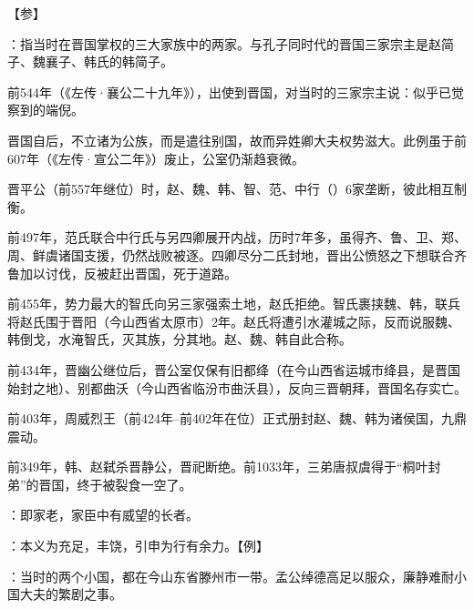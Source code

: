 {【参】}
{}


{
\item {}：指当时在晋国掌权的三大家族中的两家。与孔子同时代的晋国三家宗主是赵简子、魏襄子、韩氏的韩简子。

前544年（《左传·襄公二十九年》），出使到晋国，对当时的三家宗主说：似乎已觉察到的端倪。
\begin{lyenumerate}
\item 晋国自后，不立诸为公族，而是遣往别国，故而异姓卿大夫权势滋大。此例虽于前607年（《左传·宣公二年》）废止，公室仍渐趋衰微。
\item {}晋平公（前557年继位）时，赵、魏、韩、智、范、中行（）6家垄断，彼此相互制衡。
\item {}前497年，范氏联合中行氏与另四卿展开内战，历时7年多，虽得齐、鲁、卫、郑、周、鲜虞诸国支援，仍然战败被逐。四卿尽分二氏封地，晋出公愤怒之下想联合齐鲁加以讨伐，反被赶出晋国，死于道路。
\item 前455年，势力最大的智氏向另三家强索土地，赵氏拒绝。智氏裹挟魏、韩，联兵将赵氏围于晋阳（今山西省太原市）2年。赵氏将遭引水灌城之际，反而说服魏、韩倒戈，水淹智氏，灭其族，分其地。赵、魏、韩自此合称。
\item 前434年，晋幽公继位后，晋公室仅保有旧都绛（在今山西省运城市绛县，是晋国始封之地）、别都曲沃（今山西省临汾市曲沃县），反向三晋朝拜，晋国名存实亡。
\item 前403年，周威烈王（前424年--前402年在位）正式册封赵、魏、韩为诸侯国，九鼎震动。
\item 前349年，韩、赵弑杀晋静公，晋祀断绝。前1033年，三弟唐叔虞得于“桐叶封弟”的晋国，终于被裂食一空了。
\end{lyenumerate}
\item {}：即家老，家臣中有威望的长者。

\item {}：本义为充足，丰饶，引申为行有余力。【例】 
\item {}：当时的两个小国，都在今山东省滕州市一带。孟公绰德高足以服众，廉静难耐小国大夫的繁剧之事。
}
{}


